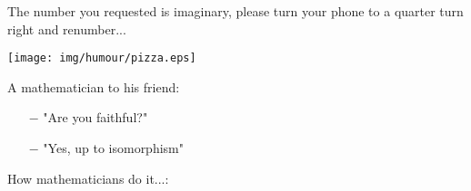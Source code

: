 	The number you requested is imaginary, please turn your phone to a quarter turn right and renumber...
	\begin{center}\underline{\hspace{5 cm}}\end{center}
	
	\begin{center}
		\texttt{[image: img/humour/pizza.eps]}	
	\end{center}
	\begin{center}\underline{\hspace{5 cm}}\end{center}
	
	A mathematician to his friend:

\begin{itemize}	 
	\item[$-$] "Are you faithful?"

	\item[$-$] "Yes, up to isomorphism"	
\end{itemize}

	\begin{center}\underline{\hspace{5 cm}}\end{center}
	
	How mathematicians do it...:
	
